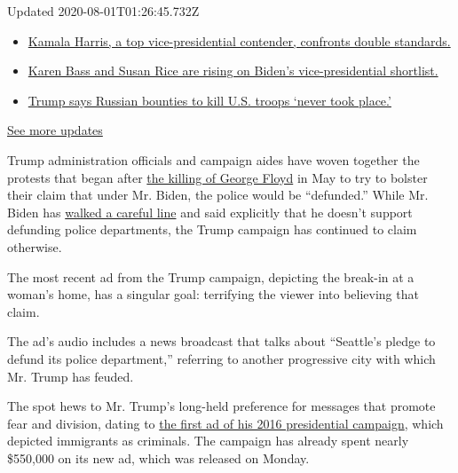 Updated 2020-08-01T01:26:45.732Z

\begin{itemize}
\tightlist
\item
  \href{https://www.nytimes.com/2020/07/31/us/elections/biden-vs-trump.html?action=click\&pgtype=Article\&state=default\&region=MAIN_CONTENT_1\&context=storylines_live_updates\#link-29fdff45}{Kamala
  Harris, a top vice-presidential contender, confronts double
  standards.}
\item
  \href{https://www.nytimes.com/2020/07/31/us/elections/biden-vs-trump.html?action=click\&pgtype=Article\&state=default\&region=MAIN_CONTENT_1\&context=storylines_live_updates\#link-13ec3d9c}{Karen
  Bass and Susan Rice are rising on Biden's vice-presidential
  shortlist.}
\item
  \href{https://www.nytimes.com/2020/07/31/us/elections/biden-vs-trump.html?action=click\&pgtype=Article\&state=default\&region=MAIN_CONTENT_1\&context=storylines_live_updates\#link-49e9a016}{Trump
  says Russian bounties to kill U.S. troops `never took place.'}
\end{itemize}

\href{https://www.nytimes.com/2020/07/31/us/elections/biden-vs-trump.html?action=click\&pgtype=Article\&state=default\&region=MAIN_CONTENT_1\&context=storylines_live_updates}{See
more updates}

Trump administration officials and campaign aides have woven together
the protests that began after
\href{https://www.nytimes.com/2020/05/31/us/george-floyd-investigation.html}{the
killing of George Floyd} in May to try to bolster their claim that under
Mr. Biden, the police would be ``defunded.'' While Mr. Biden has
\href{https://www.nytimes.com/2020/06/08/us/politics/biden-defund-the-police.html}{walked
a careful line} and said explicitly that he doesn't support defunding
police departments, the Trump campaign has continued to claim otherwise.

The most recent ad from the Trump campaign, depicting the break-in at a
woman's home, has a singular goal: terrifying the viewer into believing
that claim.

The ad's audio includes a news broadcast that talks about ``Seattle's
pledge to defund its police department,'' referring to another
progressive city with which Mr. Trump has feuded.

The spot hews to Mr. Trump's long-held preference for messages that
promote fear and division, dating to
\href{https://www.nytimes.com/2016/01/05/us/politics/in-first-ad-donald-trump-plays-to-fears-on-immigration-and-isis.html}{the
first ad of his 2016 presidential campaign}, which depicted immigrants
as criminals. The campaign has already spent nearly \$550,000 on its new
ad, which was released on Monday.

